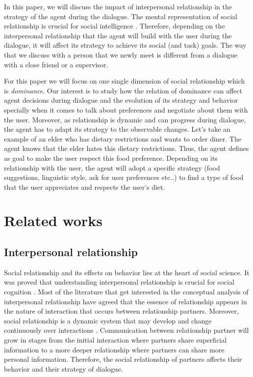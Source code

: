 \documentclass{llncs}
\begin{document}
In this paper, we will discuss the impact of interpersonal relationship in the strategy of the agent during the dialogue. The mental representation of social relationship is crucial for social intelligence \cite{haslam1994mental}. Therefore, depending on the interpersonal relationship that the agent will build with the user during the dialogue, it will affect its strategy to achieve its social (and task) goals. The way that we discuss with a person that we newly meet is different from a dialogue with a close friend or a supervisor. 
\par For this paper we will focus on one single dimension of social relationship which is \textit{dominance}. Our interest is to study how the relation of dominance can affect agent decisions during dialogue and the evolution of its strategy and behavior specially when it comes to talk about preferences and negotiate about them with the user. Moreover, as relationship is dynamic and can progress during dialogue, the agent has to adapt its strategy to the observable changes. Let's take an example of an elder  who has dietary restrictions and wants to order diner. The agent knows that the elder hates this dietary restrictions. Thus, the agent defines as goal to make the user respect this food preference. Depending on its relationship with the user, the agent will adopt a specific strategy (food suggestions, linguistic style, ask for user preferences etc..) to find a type of food that the user appreciates and respects the user's diet.



\section{Related works}
\subsection{Interpersonal relationship}
Social relationship and its effects on behavior lies at the heart of social science. It was proved that understanding interpersonal relationship is crucial for social cognition \cite{reis2000relationship}. Most of the literature that get interested in the conceptual analysis of interpersonal relationship have agreed that the essence of relationship appears in the nature of interaction that occurs between relationship partners. Moreover, social relationship is a dynamic system that may develop and change continuously over interactions \cite{reis2000relationship,svennevig2000getting}.
Communication between relationship partner will grow in stages from the initial interaction where partners share superficial information to a more deeper relationship where partners can share more personal information. Therefore, the social relationship of partners affects their behavior and their strategy of dialogue.
\end{document}
